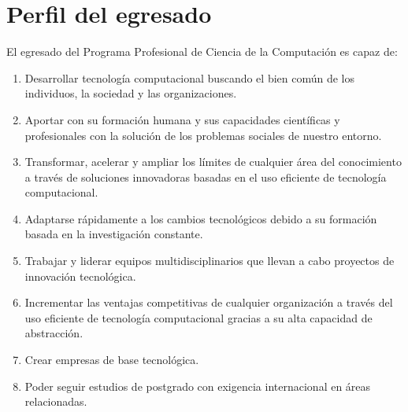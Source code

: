 \section{Perfil del egresado}

El egresado del Programa Profesional de Ciencia de la Computación es capaz de: 
\begin{enumerate}
\item Desarrollar tecnologí­a computacional buscando el bien común de los individuos, la sociedad y las organizaciones.
\item Aportar con su formación humana y sus capacidades cientí­ficas y profesionales con la solución de los problemas sociales de nuestro entorno.
\item Transformar, acelerar y ampliar los lí­mites de cualquier área del conocimiento a través de soluciones innovadoras basadas en el uso eficiente de tecnologí­a computacional.
\item Adaptarse rápidamente a los cambios tecnológicos debido a su formación basada en la investigación constante.
\item Trabajar y liderar equipos multidisciplinarios que llevan a cabo proyectos de innovación tecnológica.
\item Incrementar las ventajas competitivas de cualquier organización a través del uso eficiente de tecnologí­a computacional gracias a su alta capacidad de abstracción.
\item Crear empresas de base tecnológica.
\item Poder seguir estudios de postgrado con exigencia internacional en áreas relacionadas.
\end{enumerate}